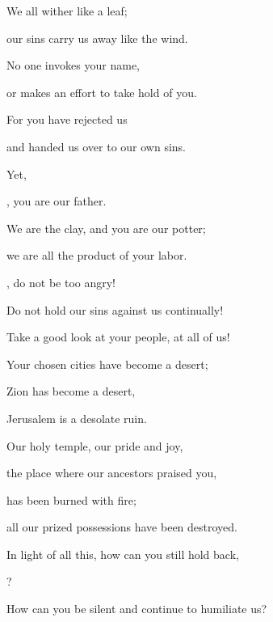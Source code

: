 {\par }{\Q We all
wither
like a leaf;
\par }{\Q our sins
carry
us away
like the wind.
\par }{\Q {}No
one invokes
your name,
\par }{\Q or
makes an effort
to take hold
of you.
\par }{\Q For
you have rejected
us

\par }{\Q and handed
us over
to our own sins.
\par }{\Q {}Yet,

{}, you
are our father.
\par }{\Q We
are the clay,
and you
are our potter;
\par }{\Q we are all
the product of your labor.
\par }{\Q {}, do not
be too angry!
\par }{\Q Do not
hold
our sins
against
us
continually!

\par }{\Q Take a good look
at your people,
at all
of us!
\par }{\Q {}Your chosen
cities
have become
a desert;
\par }{\Q Zion
has become a desert,
\par }{\Q Jerusalem
is a desolate ruin.
\par }{\Q {}Our holy
temple,
our pride
and joy,

\par }{\Q the place where
our ancestors
praised
you,
\par }{\Q has been
burned
with fire;
\par }{\Q all
our prized possessions
have been
destroyed.
\par }{\Q {}In
light of all this,
how can you still hold back,

{}?
\par }{\Q How can you be silent
and continue
to humiliate us?

\par }

